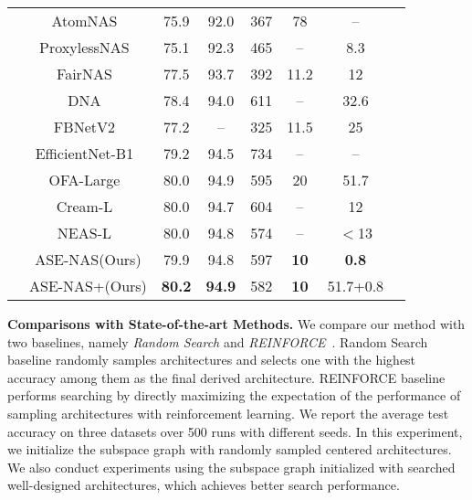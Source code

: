 \documentclass[lettersize,journal]{IEEEtran}
\newcommand{\sexyname}{ASE-NAS\xspace}
\newcommand{\sexynameplus}{ASE-NAS+\xspace}
\newcommand{\bottomline}{\bottomrule [0.1em]}
\begin{document}
\begin{table*}[t]
{{\begin{tabular}{c|ccccccc}
     & AtomNAS~\cite{Mei2020AtomNAS} & 75.9 & 92.0  & 367 & 78  & --\\
& ProxylessNAS~\cite{cai2018proxylessnas} & 75.1 & 92.3  & 465 & -- & 8.3\\
& FairNAS~\cite{chu2021fairnas} & 77.5 & 93.7 & 392 & 11.2 & 12 \\
    & DNA~\cite{li2020block}& 78.4 & 94.0 & 611 & -- & 32.6 \\
    & FBNetV2~\cite{FBNETV2} & 77.2 & --  & 325 & 11.5 & 25\\
& EfficientNet-B1~\cite{EfficientNet}& 79.2 & 94.5 & 734 & -- & --\\
    & OFA-Large~\cite{Cai2020Once} & 80.0 & 94.9  & 595 & 20 & 51.7\\
    & Cream-L~\cite{peng2020cream} & 80.0 & 94.7 & 604 & -- & 12\\
    & NEAS-L~\cite{chen2021oneshot} & 80.0 & 94.8 & 574 & -- & $<$13 \\
    & \sexyname (Ours) & 79.9 & 94.8 & 597 & \textbf{10} & \textbf{0.8}\\
    & \sexynameplus (Ours) & \textbf{80.2} & \textbf{94.9} & 582 & \textbf{10} & 51.7+0.8\\
    \bottomline
    \end{tabular}
    }
    }
	\label{tab:imagenet}
\end{table*}

\textbf{Comparisons with State-of-the-art Methods.}
We compare our method with two baselines, namely \textit{Random Search} and \textit{REINFORCE}~\cite{williams1992simple}. 
Random Search baseline randomly samples architectures and selects one with the highest accuracy among them as the final derived architecture.
REINFORCE baseline performs searching by directly maximizing the expectation of the performance of sampling architectures with reinforcement learning.
We report the average test accuracy on three datasets over 500 runs with different seeds.
In this experiment, we initialize the subspace graph with randomly sampled centered architectures.
We also conduct experiments using the subspace graph initialized with searched well-designed architectures, which achieves better search performance.
\end{document}
